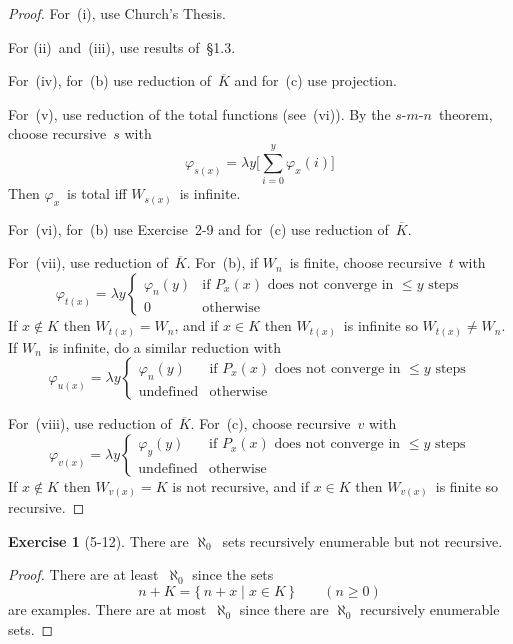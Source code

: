 \documentclass[letterpaper]{article}
\newcommand{\comp}[1]{\overline{#1}}
\newcommand{\smn}{$s$-$m$-$n$}
\theoremstyle{definition}
\newtheorem*{exer}{Exercise}
\theoremstyle{remark}
\theoremstyle{direction}
\begin{document}
\begin{proof}
For~(i), use Church's Thesis.

For (ii)~and~(iii), use results of~\S1.3.

For~(iv), for~(b) use reduction of~$\comp{K}$ and for~(c) use projection.

For~(v), use reduction of the total functions (see~(vi)). By the \smn\ theorem, choose recursive~$s$ with
$$\varphi_{s(x)}=\lambda y\bigl[\sum_{i=0}^y\varphi_x(i)\bigr]$$
Then $\varphi_x$~is total iff $W_{s(x)}$~is infinite.

For~(vi), for~(b) use Exercise~2-9 and for~(c) use reduction of~$\comp{K}$.

For~(vii), use reduction of~$\comp{K}$. For~(b), if $W_n$~is finite, choose recursive~$t$ with
$$\varphi_{t(x)}=\lambda y\begin{cases}
\varphi_n(y)&\text{if }P_x(x)\text{ does not converge in }\le y\text{ steps}\\
0&\text{otherwise}
\end{cases}$$
If $x\not\in K$ then $W_{t(x)}=W_n$, and if $x\in K$ then $W_{t(x)}$~is infinite so $W_{t(x)}\ne W_n$. If $W_n$~is infinite, do a similar reduction with
$$\varphi_{u(x)}=\lambda y\begin{cases}
\varphi_n(y)&\text{if }P_x(x)\text{ does not converge in }\le y\text{ steps}\\
\text{undefined}&\text{otherwise}
\end{cases}$$

For~(viii), use reduction of~$\comp{K}$. For~(c), choose recursive~$v$ with
$$\varphi_{v(x)}=\lambda y\begin{cases}
\varphi_y(y)&\text{if }P_x(x)\text{ does not converge in }\le y\text{ steps}\\
\text{undefined}&\text{otherwise}
\end{cases}$$
If $x\not\in K$ then $W_{v(x)}=K$ is not recursive, and if $x\in K$ then $W_{v(x)}$~is finite so recursive.
\end{proof}

\begin{exer}[5-12]
There are $\aleph_0$~sets recursively enumerable but not recursive.
\end{exer}
\begin{proof}
There are at least~$\aleph_0$ since the sets
$$n+K=\{\,n+x\mid x\in K\,\}\qquad(n\ge0)$$
are examples. There are at most~$\aleph_0$ since there are $\aleph_0$ recursively enumerable sets.
\end{proof}
\end{document}

